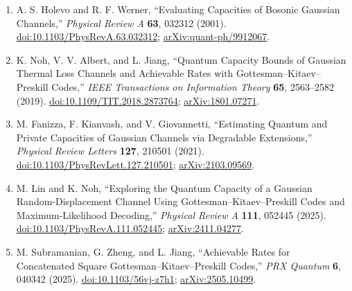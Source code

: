 \begin{enumerate}[label={},leftmargin=4.8em,labelsep=0.5em]
  \footnotesize
  \item[\textup{[HW01]}]\label{ref:p64-holevo-werner}
  A. S. Holevo and R. F. Werner,
  ``Evaluating Capacities of Bosonic Gaussian Channels,''
  \emph{Physical Review A} \textbf{63}, 032312 (2001).
  \href{https://doi.org/10.1103/PhysRevA.63.032312}%
       {doi:10.1103/PhysRevA.63.032312};
  \href{https://arxiv.org/abs/quant-ph/9912067}%
       {arXiv:quant-ph/9912067}.

  \item[\textup{[NAJ19]}]\label{ref:p64-noh-albert-jiang}
  {\sloppy
  K. Noh, V. V. Albert, and L. Jiang,
  ``Quantum Capacity Bounds of Gaussian Thermal Loss Channels and Achievable
  Rates with Gottesman--Kitaev--Preskill Codes,''
  \emph{IEEE Transactions on Information Theory} \textbf{65}, 2563--2582
  (2019).
  \href{https://doi.org/10.1109/TIT.2018.2873764}%
       {doi:10.1109/TIT.2018.2873764};
  \href{https://arxiv.org/abs/1801.07271}{arXiv:1801.07271}.
  \par}

  \item[\textup{[FKG21]}]\label{ref:p64-fanizza-kianvash-giovannetti}
  M. Fanizza, F. Kianvash, and V. Giovannetti,
  ``Estimating Quantum and Private Capacities of Gaussian Channels via
  Degradable Extensions,'' \emph{Physical Review Letters} \textbf{127},
  210501 (2021).
  \href{https://doi.org/10.1103/PhysRevLett.127.210501}%
       {doi:10.1103/PhysRevLett.127.210501};
  \href{https://arxiv.org/abs/2103.09569}{arXiv:2103.09569}.

  \item[\textup{[LN25]}]\label{ref:p64-lin-noh}
  M. Lin and K. Noh,
  ``Exploring the Quantum Capacity of a Gaussian Random-Displacement Channel
  Using Gottesman--Kitaev--Preskill Codes and Maximum-Likelihood Decoding,''
  \emph{Physical Review A} \textbf{111}, 052445 (2025).
  \href{https://doi.org/10.1103/PhysRevA.111.052445}%
       {doi:10.1103/PhysRevA.111.052445};
  \href{https://arxiv.org/abs/2411.04277}{arXiv:2411.04277}.

  \item[\textup{[SZJ25]}]\label{ref:p64-subramanian-zheng-jiang}
  M. Subramanian, G. Zheng, and L. Jiang,
  ``Achievable Rates for Concatenated Square Gottesman--Kitaev--Preskill
  Codes,'' \emph{PRX Quantum} \textbf{6}, 040342 (2025).
  \href{https://doi.org/10.1103/56vj-z7h1}{doi:10.1103/56vj-z7h1};
  \href{https://arxiv.org/abs/2505.10499}{arXiv:2505.10499}.
\end{enumerate}

